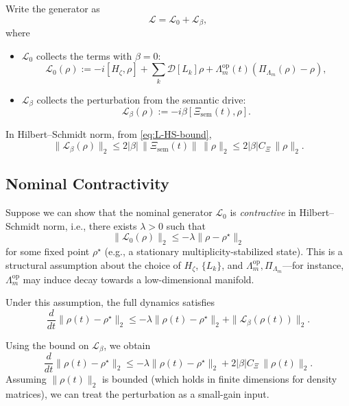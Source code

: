 \documentclass[11pt]{article}
\begin{document}
Write the generator as
\[
\mathcal{L} = \mathcal{L}_0 + \mathcal{L}_{\beta},
\]
where
\begin{itemize}[nosep]
  \item \(\mathcal{L}_0\) collects the terms with \(\beta = 0\):
    \[
      \mathcal{L}_0(\rho)
      := -i[H_\zeta,\rho]
         + \sum_k \mathcal{D}[L_k]\rho
         + \Lambda_m^{\mathrm{op}}(t)(\Pi_{\Lambda_m}(\rho) - \rho),
    \]
  \item \(\mathcal{L}_{\beta}\) collects the perturbation from the semantic drive:
    \[
      \mathcal{L}_{\beta}(\rho)
      := -i\beta[\Xi_{\mathrm{sem}}(t), \rho].
    \]
\end{itemize}

In Hilbert--Schmidt norm, from \eqref{eq:L-HS-bound},
\[
\|\mathcal{L}_{\beta}(\rho)\|_2
\le 2|\beta|\,\|\Xi_{\mathrm{sem}}(t)\|\,\|\rho\|_2
\le 2|\beta| C_{\Xi}\,\|\rho\|_2.
\]

\subsection{Nominal Contractivity}

Suppose we can show that the nominal generator \(\mathcal{L}_0\) is \emph{contractive} in Hilbert--Schmidt norm, i.e., there exists \(\lambda > 0\) such that
\begin{equation}
  \|\mathcal{L}_0(\rho)\|_2
  \le -\lambda \|\rho - \rho^\star\|_2 \label{eq:L0-contractivity}
\end{equation}
for some fixed point \(\rho^\star\) (e.g., a stationary multiplicity-stabilized state). This is a structural assumption about the choice of \(H_\zeta\), \(\{L_k\}\), and \(\Lambda_m^{\mathrm{op}}, \Pi_{\Lambda_m}\)---for instance, \(\Lambda_m^{\mathrm{op}}\) may induce decay towards a low-dimensional manifold.

Under this assumption, the full dynamics satisfies
\[
\frac{d}{dt}\|\rho(t) - \rho^\star\|_2
\le -\lambda \|\rho(t) - \rho^\star\|_2
    + \|\mathcal{L}_\beta(\rho(t))\|_2.
\]

Using the bound on \(\mathcal{L}_\beta\), we obtain
\begin{equation}
  \frac{d}{dt}\|\rho(t) - \rho^\star\|_2
  \le -\lambda \|\rho(t) - \rho^\star\|_2
      + 2|\beta| C_{\Xi}\,\|\rho(t)\|_2. \label{eq:small-gain-ineq}
\end{equation}
Assuming \(\|\rho(t)\|_2\) is bounded (which holds in finite dimensions for density matrices), we can treat the perturbation as a small-gain input.
\end{document}
